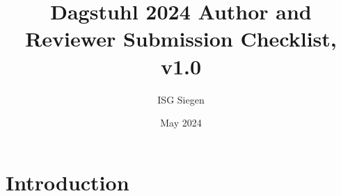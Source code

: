 \documentclass{article}
\title{Dagstuhl 2024 Author and Reviewer Submission Checklist, v1.0}
\author{ISG Siegen}
\date{May 2024}
\begin{document}
\maketitle

\section{Introduction}
\end{document}
